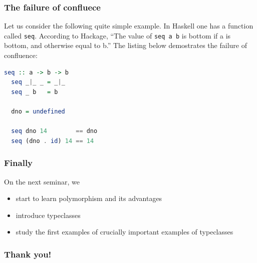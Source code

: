 \documentclass[10pt,pdf,utf8,russian,aspectratio=169]{beamer}
\begin{document}
\begin{frame}[fragile]
  \frametitle{The failure of confluece}

  Let us consider the following quite simple example. In Haskell one has a function called \verb"seq". According to Hackage, ``The value of \verb"seq a b" is bottom if a is bottom, and otherwise equal to b.'' The listing below demostrates the failure of confluence:

  \begin{lstlisting}[language=Haskell]
  seq :: a -> b -> b
  seq _|_ _ = _|_
  seq _ b   = b

  dno = undefined

  seq dno 14        == dno
  seq (dno . id) 14 == 14
  \end{lstlisting}

\end{frame}

\begin{frame}
  \frametitle{Finally}


On the next seminar, we
\begin{itemize}
  \item start to learn polymorphism and its advantages
  \item introduce typeclasses
  \item study the first examples of crucially important examples of typeclasses
\end{itemize}
\end{frame}

\begin{frame}
  \frametitle{Thank you!}
\end{frame}
\end{document}
